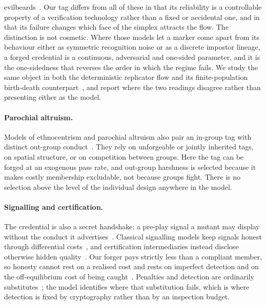 evilbeards~\citep{garcia2014evilbeards}. Our tag differs from all of these in
that its reliability is a controllable property of a verification technology
rather than a fixed or accidental one, and in that its failure changes which
face of the simplex attracts the flow. The distinction is not cosmetic. Where
those models let a marker come apart from its behaviour either as symmetric
recognition noise or as a discrete impostor lineage, a forged credential is a
continuous, adversarial and one-sided parameter, and it is the one-sidedness
that reverses the order in which the regime fails. We study the same object in
both the deterministic replicator flow and its finite-population birth-death
counterpart~\citep{traulsen2006stochastic}, and report where the two readings
disagree rather than presenting either as the model.

\paragraph{Parochial altruism.}
Models of ethnocentrism and parochial altruism also pair an in-group tag with
distinct out-group conduct~\citep{hammond2006ethnocentrism,choi2007parochial}.
They rely on unforgeable or jointly inherited tags, on spatial structure, or on
competition between groups. Here the tag can be forged at an exogenous pass
rate, and out-group harshness is selected because it makes costly membership
excludable, not because groups fight. There is no selection above the level of
the individual design anywhere in the model.

\paragraph{Signalling and certification.}
The credential is also a secret handshake: a pre-play signal a mutant may
display without the conduct it advertises~\citep{robson1990efficiency}.
Classical signalling models keep signals honest through differential
costs~\citep{grafen1990biological,spence1973job}, and certification
intermediaries instead disclose otherwise hidden
quality~\citep{dranove2010quality,leland1979quacks}. Our forger pays strictly
less than a compliant member, so honesty cannot rest on a realised cost and
rests on imperfect detection and on the off-equilibrium cost of being
caught~\citep{szamado2011cost}. Penalties and detection are ordinarily
substitutes~\citep{becker1968crime}; the model identifies where that
substitution fails, which is where detection is fixed by cryptography rather
than by an inspection budget.

